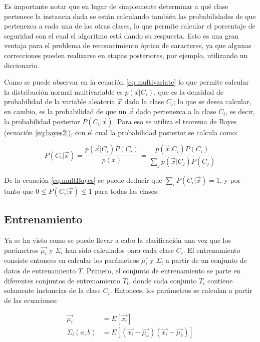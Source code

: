 \documentclass[a4paper, 11pt, oneside]{report}
\begin{document}
Es importante notar que en lugar de simplemente determinar a qué clase pertenece la instancia dada se están calculando también las probabilidades de que pertenezca a cada una de las otras clases, lo que permite calcular el porcentaje de seguridad con el cual el algoritmo está dando su respuesta. Esto es una gran ventaja para el problema de reconocimiento óptico de caracteres, ya que algunas correcciones pueden realizarse en etapas posteriores, por ejemplo, utilizando un diccionario.

Como se puede observar en la ecuación \eqref{eq:multivariate} lo que permite calcular la distribución normal multivariable es $p(x|C_i)$, que es la densidad de probabilidad de la variable aleatoria $\vec{x}$ dada la clase $C_i$; lo que se desea calcular, en cambio, es la probabilidad de que un $\vec{x}$ dado pertenezca a la clase $C_i$, es decir, la probabilidad posterior $P(C_i|\vec{x})$. Para eso se utiliza el teorema de Bayes (ecuación \ref{eq:bayes2}), con el cual la probabilidad posterior se calcula como:

	\begin{equation}\label{eq:multBayes}
		P(C_i|\vec{x}) = \frac{p(\vec{x}|C_i)P(C_i)}{p(x)} = \frac{p(\vec{x}|C_i)P(C_i)}{ \sum_j{p(\vec{x}|C_j)P(C_j)} }
	\end{equation}
	
De la ecuación \ref{eq:multBayes} se puede deducir que $\sum_i{P(C_i|\vec{x})}=1$, y por tanto que $0 \le P(C_i|\vec{x}) \le 1$ para todas las clases.
	
\subsection{Entrenamiento}

Ya se ha visto como se puede llevar a cabo la clasificación una vez que los parámetros $\vec{\mu_i}$ y $\Sigma_i$ han sido calculados para cada clase $C_i$. El entrenamiento consiste entonces en calcular los parámetros $\vec{\mu_i}$ y $\Sigma_i$ a partir de un conjunto de datos de entrenamiento $T$. Primero, el conjunto de entrenamiento se parte en diferentes conjuntos de entrenamiento $T_i$, donde cada conjunto $T_i$ contiene solamente instancias de la clase $C_i$. Entonces, los parámetros se calculan a partir de las ecuaciones:

	\begin{equation}\label{eq:multiParams}
	\begin{aligned}
		\vec{\mu_i} &= E[ \vec{x_i} ] \\
		\Sigma_i(a,b) &= E[ (\vec{x_i}-\vec{\mu_a})(\vec{x_i}-\vec{\mu_b}) ]
	\end{aligned}
	\end{equation}
\end{document}
